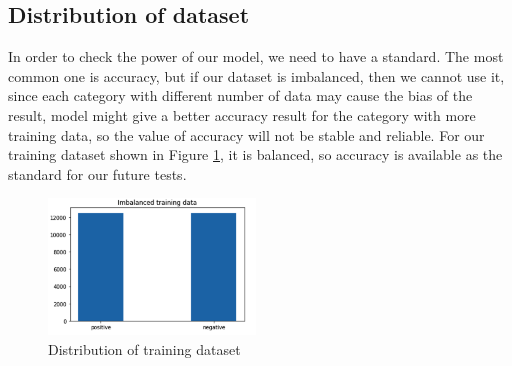 \documentclass{article}
\begin{document}
\subsection{Distribution of dataset}
In order to check the power of our model, we need to have a standard. The most common one is accuracy, but if our dataset is imbalanced, then we cannot use it, since each category with different number of data may cause the bias of the result, model might give a better accuracy result for the category with more training data, so the value of accuracy will not be stable and reliable. For our training dataset shown in Figure \ref{fig:imb}, it is balanced, so accuracy is available as the standard for our future tests.
\FloatBarrier
\begin{figure}[htb]
    \centering
    \includegraphics[width=5.5cm]{imbalanced}
    \caption{Distribution of training dataset}
    \label{fig:imb}
\end{figure}
\FloatBarrier
\end{document}
